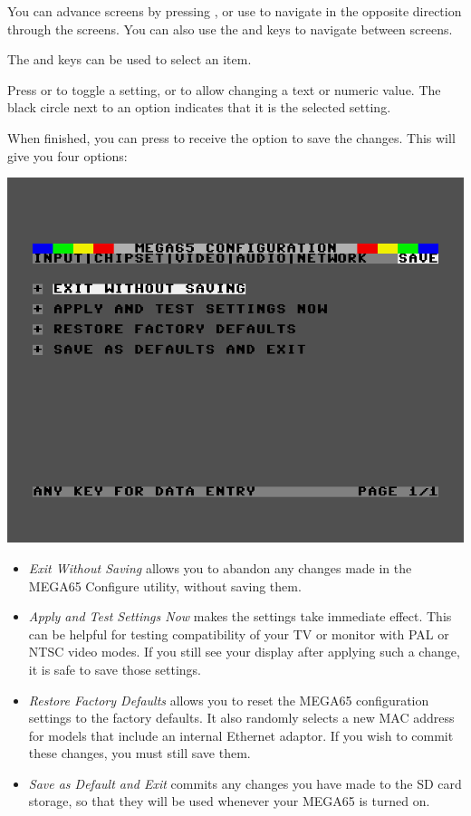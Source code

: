 You can advance screens by pressing , or use 
to navigate in the opposite direction through the screens. You can also
use the \megakey{$\leftarrow$} and \megakey{$\rightarrow$} keys to
navigate between screens.

The
\megakey{$\uparrow$} and \megakey{$\downarrow$} keys can be used to
select an item.

Press  or  to toggle a setting, or to
allow changing a text or numeric value.  The black circle next to an
option indicates that it is the selected setting.

When finished, you can press  to receive the
option to save the changes. This will give you four options:  

\includegraphics[width=\linewidth]{images/ss-m65config-save.png}

\begin{itemize}
  \item{\em Exit Without Saving} allows you to abandon any changes
    made in the MEGA65 Configure utility, without saving them.
  \item{\em Apply and Test Settings Now} makes the settings take
    immediate effect.  This can be helpful for testing compatibility
    of your TV or monitor with PAL or NTSC video modes.  If you
    still see your display after applying such a change,
    it is safe to save those settings.
  \item{\em Restore Factory Defaults} allows you to reset the
    MEGA65 configuration settings to the factory defaults. It also
    randomly selects a new MAC address for models that include an
    internal Ethernet adaptor.  If you wish to commit these
    changes, you must still save them.
  \item{\em Save as Default and Exit} commits any changes you
    have made to the SD card storage, so that they will be used
    whenever your MEGA65 is turned on.
\end{itemize}


